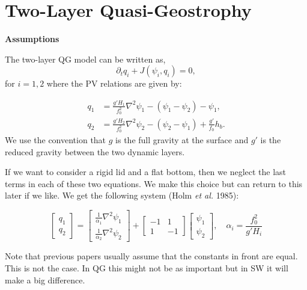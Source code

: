 \documentclass[12pt]{article}
\begin{document}
\section{Two-Layer Quasi-Geostrophy}

  \textbf{Assumptions}

  The two-layer QG model can be written as,
  $$
  \partial_t q_i + J(\psi_i, q_i) = 0,
  $$
  for $i=1,2$ where the PV relations are given by:

  \begin{align*}
    q_1 &= \frac{g'H_1}{f_0^2}\nabla^2 \psi_1 - (\psi_1 - \psi_2) - \psi_1,\\
    q_2 &= \frac{g'H_2}{f_0^2}\nabla^2 \psi_2 - (\psi_2 - \psi_1) + \frac{g'}{f_0} h_b.
  \end{align*}
  We use the convention that $g$ is the full gravity at the surface and $g'$ is the reduced gravity between the two dynamic layers.  

  If we want to consider a rigid lid and a flat bottom, then we neglect the last terms in each of these two equations.  We make this choice but can return to this later if we like. We get the following system (Holm \emph{et al.} 1985):

  \begin{equation}
    \left[\begin{array}{c}
      q_1 \\
      q_2
    \end{array}\right]
    =
    \left[\begin{array}{c}
      \frac{1}{\alpha_1}\nabla^2 \psi_1 \\
      \frac{1}{\alpha_2}\nabla^2 \psi_2
    \end{array}\right]
    +
    \left[\begin{array}{cc}
      -1 & 1 \\
      1 & -1
    \end{array}\right]
    \left[\begin{array}{c}
      \psi_1 \\
      \psi_2
    \end{array}\right],
    \quad \alpha_i = \frac{f_0^2}{g'H_i}
  \end{equation}

  Note that previous papers usually assume that the constants in front are equal. This is not the case.  In QG this might not be as important but in SW it will make a big difference.
\end{document}
